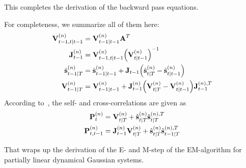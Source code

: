 		This completes the derivation of the backward pass equations.

		For completeness, we summarize all of them here:
		\begin{align}
			\boldsymbol{\mathrm{V}}_{t - 1, t \vert t - 1}^{(n)} &= \boldsymbol{\mathrm{V}}_{t - 1 \vert t - 1}^{(n)} \boldsymbol{\mathrm{A}}^T  \nonumber \\
			\boldsymbol{\mathrm{J}}_{t - 1}^{(n)} &= \boldsymbol{\mathrm{V}}_{t - 1, t \vert t - 1}^{(n)} \Big(\boldsymbol{\mathrm{V}}_{t \vert t - 1}^{(n)}\Big)^{-1}  \nonumber \\
			\hat{\boldsymbol{\mathrm{s}}}_{t - 1 \vert T}^{(n)} &= \hat{\boldsymbol{\mathrm{s}}}_{t - 1 \vert t - 1}^{(n)} + \boldsymbol{\mathrm{J}}_{t - 1} \Big(\hat{\boldsymbol{\mathrm{s}}}_{t \vert T}^{(n)} - \hat{\boldsymbol{\mathrm{s}}}_{t \vert t - 1}^{(n)}\Big)  \label{eq:posteriorMean} \\
			\boldsymbol{\mathrm{V}}_{t - 1 \vert T}^{(n)} &= \boldsymbol{\mathrm{V}}_{t - 1 \vert t - 1}^{(n)} + \boldsymbol{\mathrm{J}}_{t - 1}^{(n)} \Big(\boldsymbol{\mathrm{V}}_{t \vert T}^{(n)} - \boldsymbol{\mathrm{V}}_{t \vert t - 1}^{(n)}\Big) \boldsymbol{\mathrm{J}}_{t - 1}^{(n), T}  \label{eq:posteriorCov}
		\end{align}
		According to~\cite{minkaBayesianLinearRegression1999}, the self- and cross-correlations are given as
		\begin{align*}
			\boldsymbol{\mathrm{P}}_t^{(n)} &= \boldsymbol{\mathrm{V}}_{t \vert T}^{(n)} + \hat{\boldsymbol{\mathrm{s}}}_{t \vert T}^{(n)} \hat{\boldsymbol{\mathrm{s}}}_{t \vert T}^{(n), T} \\
			\boldsymbol{\mathrm{P}}_{t, t - 1}^{(n)} &= \boldsymbol{\mathrm{J}}_{t - 1}^{(n)} \boldsymbol{\mathrm{V}}_{t \vert T}^{(n)} + \hat{\boldsymbol{\mathrm{s}}}_{t \vert T}^{(n)} \hat{\boldsymbol{\mathrm{s}}}_{t - 1 \vert T}^{(n), T}
		\end{align*}

		That wraps up the derivation of the E- and M-step of the EM-algorithm for partially linear dynamical Gaussian systems.

